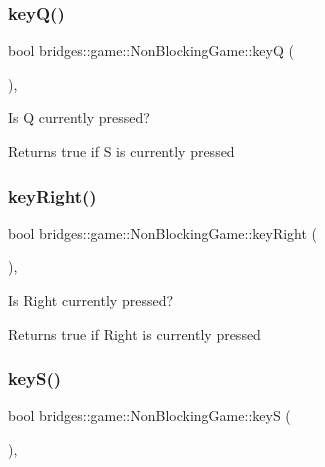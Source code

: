 \subsubsection{\texorpdfstring{key\+Q()}{keyQ()}}
{\footnotesize\ttfamily bool bridges\+::game\+::\+Non\+Blocking\+Game\+::keyQ (\begin{DoxyParamCaption}{ }\end{DoxyParamCaption})\hspace{0.3cm}{\ttfamily [inline]}, {\ttfamily [protected]}}



Is Q currently pressed? 

\begin{DoxyReturn}{Returns}
true if S is currently pressed 
\end{DoxyReturn}
\mbox{\label{classbridges_1_1game_1_1_non_blocking_game_afbea1fa2acec16e952be66ce76d496a9}} 
\subsubsection{\texorpdfstring{key\+Right()}{keyRight()}}
{\footnotesize\ttfamily bool bridges\+::game\+::\+Non\+Blocking\+Game\+::key\+Right (\begin{DoxyParamCaption}{ }\end{DoxyParamCaption})\hspace{0.3cm}{\ttfamily [inline]}, {\ttfamily [protected]}}



Is Right currently pressed? 

\begin{DoxyReturn}{Returns}
true if Right is currently pressed 
\end{DoxyReturn}
\mbox{\label{classbridges_1_1game_1_1_non_blocking_game_a75ece5d4fa35893ecacc82c5064c05e0}} 
\subsubsection{\texorpdfstring{key\+S()}{keyS()}}
{\footnotesize\ttfamily bool bridges\+::game\+::\+Non\+Blocking\+Game\+::keyS (\begin{DoxyParamCaption}{ }\end{DoxyParamCaption})\hspace{0.3cm}{\ttfamily [inline]}, {\ttfamily [protected]}}



